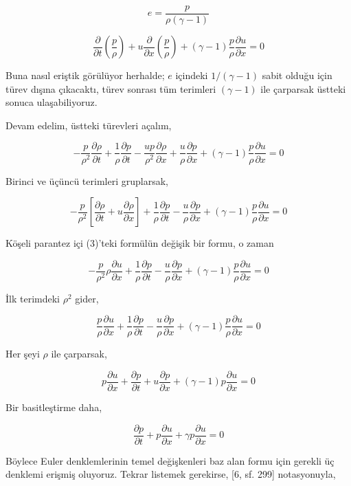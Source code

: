 \documentclass[12pt,fleqn]{article}\usepackage{../../common}
\begin{document}
$$
e = \frac{p}{\rho (\gamma - 1)}
$$

$$
\frac{\partial }{\partial t} \left(\frac{p}{\rho}\right) +
u \frac{\partial }{\partial x} \left(\frac{p}{\rho} \right) +
(\gamma - 1)\frac{p}{\rho} \frac{\partial u}{\partial x} = 0
$$

Buna nasıl eriştik görülüyor herhalde; $e$ içindeki $1/(\gamma-1)$ sabit
olduğu için türev dışına çıkacaktı, türev sonrası tüm terimleri $(\gamma-1)$
ile çarparsak üstteki sonuca ulaşabiliyoruz.

Devam edelim, üstteki türevleri açalım,

$$
-\frac{p}{\rho^2} \frac{\partial \rho}{\partial t} +
\frac{1}{\rho} \frac{\partial p}{\partial t} -
\frac{up}{\rho^2} \frac{\partial \rho}{\partial x} +
\frac{u}{\rho} \frac{\partial p}{\partial x} +
(\gamma - 1)\frac{p}{\rho} \frac{\partial u}{\partial x} = 0
$$

Birinci ve üçüncü terimleri gruplarsak,

$$
-\frac{p}{\rho^2}
\left[
  \frac{\partial \rho}{\partial t} + u \frac{\partial \rho}{\partial x}
\right] +
\frac{1}{\rho} \frac{\partial p}{\partial t} -
\frac{u}{\rho} \frac{\partial p}{\partial x} +
(\gamma - 1)\frac{p}{\rho} \frac{\partial u}{\partial x} = 0
$$

Köşeli parantez içi (3)'teki formülün değişik bir formu, o zaman

$$
-\frac{p}{\rho^2} \rho \frac{\partial u}{\partial x} +
\frac{1}{\rho} \frac{\partial p}{\partial t} -
\frac{u}{\rho} \frac{\partial p}{\partial x} +
(\gamma - 1)\frac{p}{\rho} \frac{\partial u}{\partial x} = 0
$$

İlk terimdeki $\rho^2$ gider,

$$
\frac{p}{\rho} \frac{\partial u}{\partial x} +
\frac{1}{\rho} \frac{\partial p}{\partial t} -
\frac{u}{\rho} \frac{\partial p}{\partial x} +
(\gamma - 1)\frac{p}{\rho} \frac{\partial u}{\partial x} = 0
$$

Her şeyi $\rho$ ile çarparsak,

$$
p \frac{\partial u}{\partial x} +
\frac{\partial p}{\partial t} +
u \frac{\partial p}{\partial x} +
(\gamma - 1)p \frac{\partial u}{\partial x} = 0
$$

Bir basitleştirme daha,

$$
\frac{\partial p}{\partial t} +
p \frac{\partial u}{\partial x} +
\gamma p \frac{\partial u}{\partial x} = 0
$$

Böylece Euler denklemlerinin temel değişkenleri baz alan formu için gerekli üç
denklemi erişmiş oluyoruz. Tekrar listemek gerekirse, [6, sf. 299] notasyonuyla,
\end{document}
